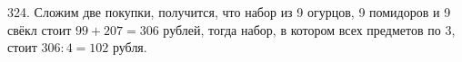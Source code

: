 324. Сложим две покупки, получится, что набор из 9 огурцов, 9 помидоров и 9 свёкл стоит $99+207=306$ рублей, тогда набор, в котором всех предметов по 3, стоит $306:4=102$ рубля.\\
